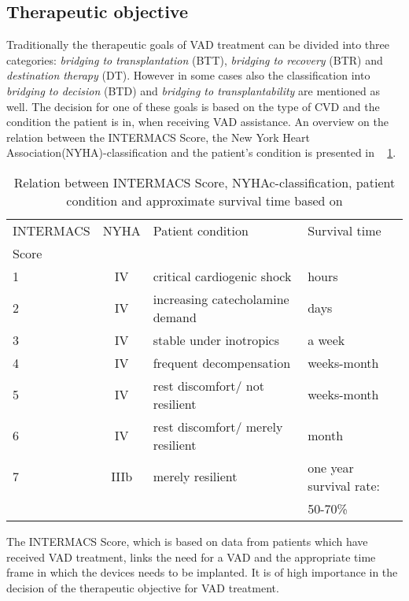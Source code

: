 \subsection{Therapeutic objective}
Traditionally the therapeutic goals of VAD treatment can be divided into three categories: \textit{bridging to transplantation} (BTT), \textit{bridging to recovery} (BTR) and \textit{destination therapy} (DT). However in some cases also the classification into \textit{bridging to decision} (BTD) and \textit{bridging to transplantability} are mentioned as well. The decision for one of these goals is based on the type of CVD and the condition the patient is in, when receiving VAD assistance.\cite{VAD6} An overview on the relation between the INTERMACS Score, the New York Heart Association(NYHA)-classification and the patient's condition is presented in \tablename~ \ref{tab:Table1}.
\begin{table}
  \begin{tabularx}{\textwidth}{l|c|l|l}
    \toprule
    INTERMACS & NYHA & Patient condition & Survival time  \\
    Score & & &\\
    \midrule
    1 & IV & critical cardiogenic shock & hours \\
    2 & IV & increasing catecholamine demand & days \\
    3 & IV & stable under inotropics & a week \\
    4 & IV & frequent decompensation & weeks-month \\
    5 & IV & rest discomfort/ not resilient & weeks-month \\
    6 & IV & rest discomfort/ merely resilient & month \\
    7 & IIIb & merely resilient & one year survival rate: \\
     & & & 50-70\% \\
     \bottomrule
  \end{tabularx}
  \caption{Relation between INTERMACS Score, NYHAc-classification, patient condition and approximate survival time based on \cite{VAD5}}
  \label{tab:Table1}
\end{table}
The INTERMACS Score, which is based on data from patients which have received VAD treatment, links the need for a VAD and the appropriate time frame in which the devices needs to be implanted. It is of high importance in the decision of the therapeutic objective for VAD treatment. \cite{VAD7}
